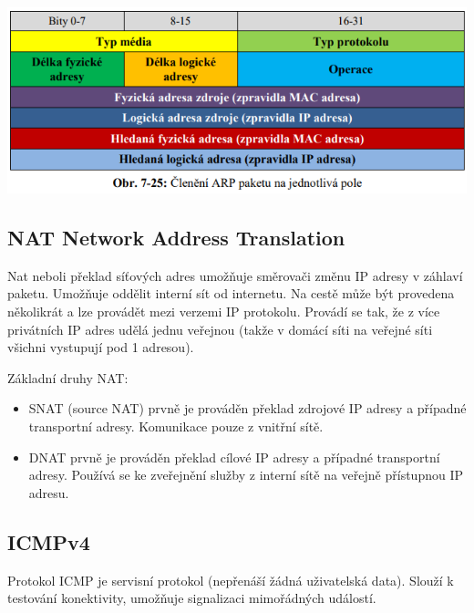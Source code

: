 \begin{center}
	\includegraphics[scale=0.5]{images/-038.png}
\end{center}
    
\subsection{NAT Network Address Translation}

Nat neboli překlad síťových adres umožňuje směrovači změnu IP adresy v záhlaví paketu. Umožňuje oddělit interní sít od internetu. Na cestě může být provedena několikrát a lze provádět mezi verzemi IP protokolu. Provádí se tak, že z více privátních IP adres udělá jednu veřejnou (takže v domácí síti na veřejné síti všichni vystupují pod 1 adresou).

Základní druhy NAT:
\begin{itemize}
    \item SNAT (source NAT) prvně je prováděn překlad zdrojové IP adresy a případné transportní adresy. Komunikace pouze z vnitřní sítě.
    \item DNAT prvně je prováděn překlad cílové IP adresy a případné transportní adresy. Používá se ke zveřejnění služby z interní sítě na veřejně přístupnou IP adresu.
\end{itemize}

\subsection{ICMPv4}

Protokol ICMP je servisní protokol (nepřenáší žádná uživatelská data). Slouží k testování konektivity, umožňuje signalizaci mimořádných událostí. 


